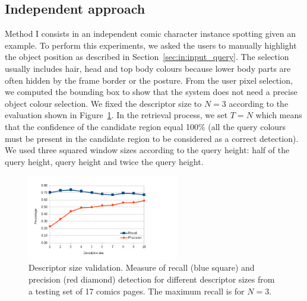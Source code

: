 

\subsection{Independent approach} %
\label{sub:ex:character_extraction_method_b}

Method I consists in an independent comic character instance spotting given an example.
To perform this experiments, we asked the users to manually highlight the object position as described in Section~\ref{sec:in:input_query}.
The selection usually includes hair, head and top body colours because lower body parts are often hidden by the frame border or the posture. 
From the user pixel selection, we computed the bounding box to show that the system does not need a precise object colour selection. 
We fixed the descriptor size to $N=3$ according to the evaluation shown in Figure~\ref{fig:ex:descriptor_size_evaluation}.
In the retrieval process, we set $T=N$ which means that the confidence of the candidate region equal 100\% (all the query colours must be present in the candidate region to be considered as a correct detection).
We used three squared window sizes according to the query height: half of the query height, query height and twice the query height.


 \begin{figure}[!ht]  %
   \centering
  \includegraphics[trim= 5mm 0mm 30mm 0mm, clip, width=250px]{descriptor_size_evaluation.png}
  \caption[Character spotting descriptor size validation]{Descriptor size validation. Measure of recall (blue square) and precision (red diamond) detection for different descriptor sizes from a testing set of 17 comics pages. The maximum recall is for $N=3$.}
  \label{fig:ex:descriptor_size_evaluation}
 \end{figure}


